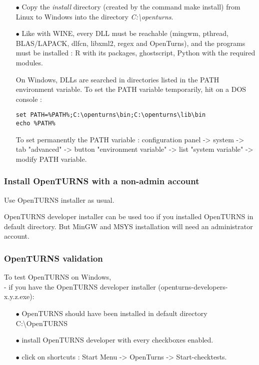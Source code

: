 \begin{itemize}
\item[$\bullet$]   Copy the \emph{install} directory (created by the command make install) from Linux to Windows into the directory \emph{C:\textbackslash openturns}.

\item[$\bullet$]   Like with WINE, every DLL must be reachable (mingwm, pthread, BLAS/LAPACK, dlfcn, libxml2, regex and OpenTurns), and the programs must be installed : R with its packages, ghostscript, Python with the required modules.

On Windows, DLLs are searched in directories listed in the PATH environment variable. To set the PATH variable temporarily, hit on a DOS console :
\begin{verbatim}
set PATH=%PATH%;C:\openturns\bin;C:\openturns\lib\bin
echo %PATH%
\end{verbatim}

To set permanently the PATH variable :
configuration panel -> system -> tab "advanced" -> button "environment variable" -> list "system variable" -> modify PATH variable.
\end{itemize}


\subsubsection{Install OpenTURNS with a non-admin account}

Use OpenTURNS installer as usual.

OpenTURNS developer installer can be used too if you installed OpenTURNS in default directory. But MinGW and MSYS installation will need an administrator account.


\subsubsection{OpenTURNS validation}

To test OpenTURNS on Windows,\\

- if you have the OpenTURNS developer installer (openturns-developers-x.y.z.exe):
\begin{itemize}
\item[$\bullet$]   OpenTURNS should have been installed in default directory C:\textbackslash OpenTURNS
\item[$\bullet$]   install OpenTURNS developer with every checkboxes enabled.
\item[$\bullet$]   click on shortcuts : Start Menu -> OpenTurns -> Start-checktests.
\end{itemize}


